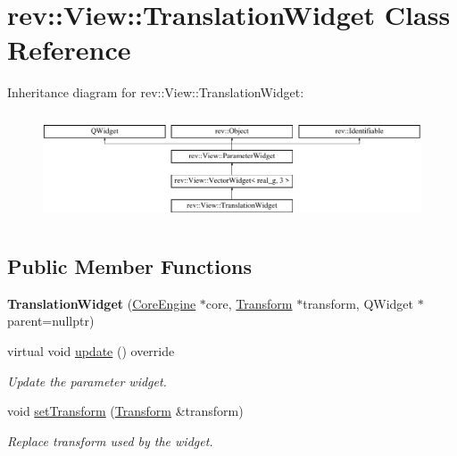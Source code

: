 \hypertarget{classrev_1_1_view_1_1_translation_widget}{}\section{rev\+::View\+::Translation\+Widget Class Reference}
\label{classrev_1_1_view_1_1_translation_widget}
Inheritance diagram for rev\+::View\+::Translation\+Widget\+:\begin{figure}[H]
\begin{center}
\leavevmode
\includegraphics[height=3.232323cm]{classrev_1_1_view_1_1_translation_widget}
\end{center}
\end{figure}
\subsection*{Public Member Functions}
\begin{DoxyCompactItemize}
\item 
\mbox{\label{classrev_1_1_view_1_1_translation_widget_a277b22177ba64e08bfddc451b9ead853}} 
{\bfseries Translation\+Widget} (\mbox{\hyperlink{classrev_1_1_core_engine}{Core\+Engine}} $\ast$core, \mbox{\hyperlink{classrev_1_1_transform}{Transform}} $\ast$transform, Q\+Widget $\ast$parent=nullptr)
\item 
\mbox{\label{classrev_1_1_view_1_1_translation_widget_afddcffcfb7188d2f89c04f3f97850ec9}} 
virtual void \mbox{\hyperlink{classrev_1_1_view_1_1_translation_widget_afddcffcfb7188d2f89c04f3f97850ec9}{update}} () override
\begin{DoxyCompactList}\small\item\em Update the parameter widget. \end{DoxyCompactList}\item 
\mbox{\label{classrev_1_1_view_1_1_translation_widget_ab3524bbd0bcc6cf6705a7f27de444e29}} 
void \mbox{\hyperlink{classrev_1_1_view_1_1_translation_widget_ab3524bbd0bcc6cf6705a7f27de444e29}{set\+Transform}} (\mbox{\hyperlink{classrev_1_1_transform}{Transform}} \&transform)
\begin{DoxyCompactList}\small\item\em Replace transform used by the widget. \end{DoxyCompactList}\end{DoxyCompactItemize}
